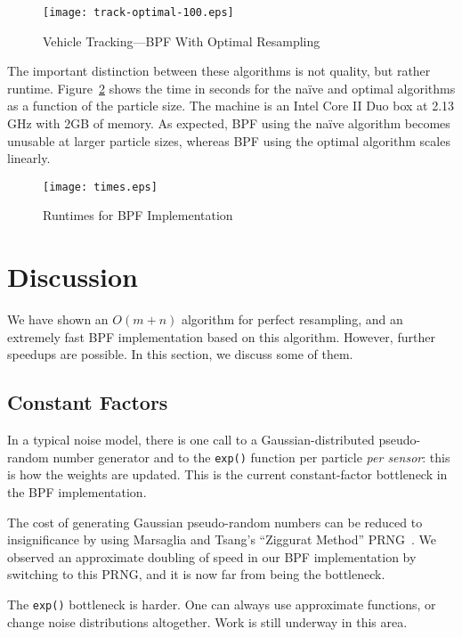 \documentclass[12pt]{article}
\begin{document}
  \begin{figure}
    \centering
    \texttt{[image: track-optimal-100.eps]}
    \caption{Vehicle Tracking---BPF With Optimal Resampling}\label{fig-track-optimal}
  \end{figure}

  The important distinction between these algorithms is not
  quality, but rather runtime.  Figure~\ref{fig-times} shows
  the time in seconds for the na\"ive and optimal algorithms
  as a function of the particle size.  The machine is an
  Intel Core II Duo box at 2.13 GHz with 2GB of memory.  As
  expected, BPF using the na\"ive algorithm becomes unusable
  at larger particle sizes, whereas BPF using the optimal
  algorithm scales linearly.

  \begin{figure}
    \centering
    \texttt{[image: times.eps]}
    \caption{Runtimes for BPF Implementation}\label{fig-times}
  \end{figure}

\section{Discussion}

We have shown an $O(m + n)$ algorithm for perfect
resampling, and an extremely fast BPF implementation based
on this algorithm.  However, further speedups are possible.
In this section, we discuss some of them.

\subsection{Constant Factors}

  In a typical noise model, there is one call
  to a Gaussian-distributed pseudo-random number generator
  and to the {\tt exp()} function per particle {\em per
  sensor}: this is how the weights are updated.  This is the
  current constant-factor bottleneck in the BPF implementation.

  The cost of generating Gaussian pseudo-random numbers can
  be reduced to insignificance by using Marsaglia and
  Tsang's ``Ziggurat Method'' PRNG~\cite{ziggurat}.  We
  observed an approximate doubling of speed in our BPF
  implementation by switching to this PRNG, and it is now
  far from being the bottleneck.

  The {\tt exp()} bottleneck is harder.  One can always use
  approximate functions, or change noise distributions
  altogether.  Work is still underway in this area.
\end{document}
